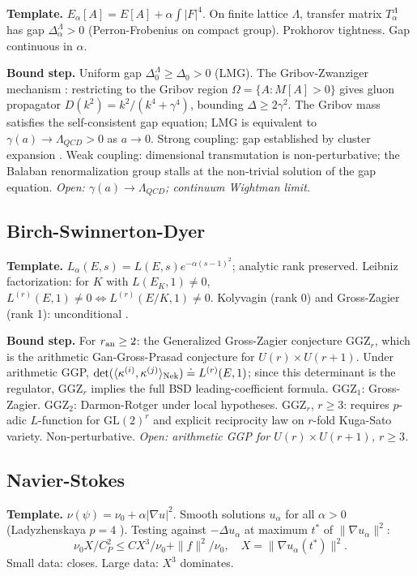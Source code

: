 \documentclass[12pt]{article}
\theoremstyle{remark}
\begin{document}
\textbf{Template.} $E_\alpha[A] = E[A] + \alpha\int|F|^4$. On finite lattice
$\Lambda$, transfer matrix $T_\alpha^\Lambda$ has gap $\Delta_\alpha^\Lambda > 0$
(Perron-Frobenius on compact group). Prokhorov tightness. Gap continuous in $\alpha$.

\textbf{Bound step.} Uniform gap $\Delta_0^\Lambda\geq\Delta_0>0$ (LMG).
The Gribov-Zwanziger mechanism \cite{zwanziger1989}: restricting to the Gribov
region $\Omega = \{A:M[A]>0\}$ gives gluon propagator $D(k^2)=k^2/(k^4+\gamma^4)$,
bounding $\Delta\geq 2\gamma^2$. The Gribov mass satisfies the self-consistent
gap equation; LMG is equivalent to $\gamma(a)\to\Lambda_{QCD}>0$ as $a\to 0$.
Strong coupling: gap established by cluster expansion \cite{seiler1982}.
Weak coupling: dimensional transmutation is non-perturbative; the Balaban
renormalization group \cite{balaban1989} stalls at the non-trivial solution of
the gap equation.
\textit{Open: $\gamma(a)\to\Lambda_{QCD}$; continuum Wightman limit.}

\subsection{Birch-Swinnerton-Dyer}

\textbf{Template.} $L_\alpha(E,s) = L(E,s)e^{-\alpha(s-1)^2}$; analytic rank
preserved. Leibniz factorization: for $K$ with $L(E_K,1)\neq 0$,
$L^{(r)}(E,1)\neq 0 \iff L^{(r)}(E/K,1)\neq 0$.
Kolyvagin (rank 0) and Gross-Zagier (rank 1): unconditional \cite{kolyvagin1988,gz1986}.

\textbf{Bound step.} For $r_{\rm an}\geq 2$: the Generalized Gross-Zagier
conjecture GGZ$_r$, which is the arithmetic Gan-Gross-Prasad conjecture for
$U(r)\times U(r+1)$. Under arithmetic GGP, $\det(\langle\kappa^{(i)},\kappa^{(j)}\rangle_{\rm Nek}) \doteq L^{(r)}(E,1)$; since this determinant is the regulator,
GGZ$_r$ implies the full BSD leading-coefficient formula. GGZ$_1$: Gross-Zagier.
GGZ$_2$: Darmon-Rotger \cite{darmonrotger2017} under local hypotheses.
GGZ$_r$, $r\geq 3$: requires $p$-adic $L$-function for $\mathrm{GL}(2)^r$ and
explicit reciprocity law on $r$-fold Kuga-Sato variety. Non-perturbative.
\textit{Open: arithmetic GGP for $U(r)\times U(r+1)$, $r\geq 3$.}

\subsection{Navier-Stokes}

\textbf{Template.} $\nu(\psi)=\nu_0+\alpha|\nabla u|^2$. Smooth solutions
$u_\alpha$ for all $\alpha>0$ (Ladyzhenskaya $p=4$ \cite{lady1967}).
Testing against $-\Delta u_\alpha$ at maximum $t^*$ of $\|\nabla u_\alpha\|^2$:
\[
\nu_0 X/C_P^2 \leq CX^3/\nu_0 + \|f\|^2/\nu_0, \quad X=\|\nabla u_\alpha(t^*)\|^2.
\]
Small data: closes. Large data: $X^3$ dominates.
\end{document}
